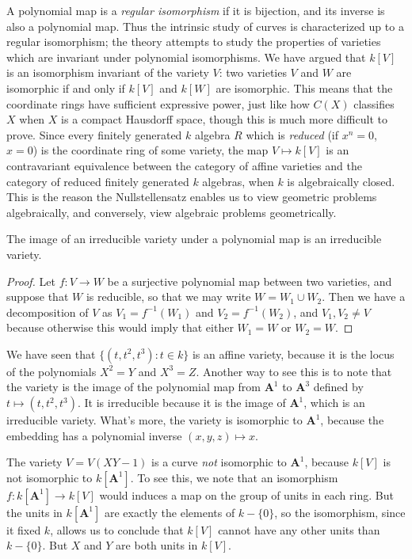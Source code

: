 A polynomial map is a \emph{regular isomorphism} if it is bijection, and its inverse is also a polynomial map. Thus the intrinsic study of curves is characterized up to a regular isomorphism; the theory attempts to study the properties of varieties which are invariant under polynomial isomorphisms. We have argued that $k[V]$ is an isomorphism invariant of the variety $V$: two varieties $V$ and $W$ are isomorphic if and only if $k[V]$ and $k[W]$ are isomorphic. This means that the coordinate rings have sufficient expressive power, just like how $C(X)$ classifies $X$ when $X$ is a compact Hausdorff space, though this is much more difficult to prove. Since every finitely generated $k$ algebra $R$ which is {\it reduced} (if $x^n = 0$, $x = 0$) is the coordinate ring of some variety, the map $V \mapsto k[V]$ is an contravariant equivalence between the category of affine varieties and the category of reduced finitely generated $k$ algebras, when $k$ is algebraically closed. This is the reason the Nullstellensatz enables us to view geometric problems algebraically, and conversely, view algebraic problems geometrically.

\begin{prop}
    The image of an irreducible variety under a polynomial map is an irreducible variety.
\end{prop}
\begin{proof}
    Let $f: V \to W$ be a surjective polynomial map between two varieties, and suppose that $W$ is reducible, so that we may write $W = W_1 \cup W_2$. Then we have a decomposition of $V$ as $V_1 = f^{-1}(W_1)$ and $V_2 = f^{-1}(W_2)$, and $V_1, V_2 \neq V$ because otherwise this would imply that either $W_1 = W$ or $W_2 = W$.
\end{proof}

\begin{example}
    We have seen that $\{ (t,t^2,t^3): t \in k \}$ is an affine variety, because it is the locus of the polynomials $X^2 = Y$ and $X^3 = Z$. Another way to see this is to note that the variety is the image of the polynomial map from $\mathbf{A}^1$ to $\mathbf{A}^3$ defined by $t \mapsto (t,t^2,t^3)$. It is irreducible because it is the image of $\mathbf{A}^1$, which is an irreducible variety. What's more, the variety is isomorphic to $\mathbf{A}^1$, because the embedding has a polynomial inverse $(x,y,z) \mapsto x$.
\end{example}

\begin{example}
    The variety $V = V(XY - 1)$ is a curve {\it not} isomorphic to $\mathbf{A}^1$, because $k[V]$ is not isomorphic to $k[\mathbf{A}^1]$. To see this, we note that an isomorphism $f: k[\mathbf{A}^1] \to k[V]$ would induces a map on the group of units in each ring. But the units in $k[\mathbf{A}^1]$ are exactly the elements of $k - \{ 0 \}$, so the isomorphism, since it fixed $k$, allows us to conclude that $k[V]$ cannot have any other units than $k - \{ 0 \}$. But $X$ and $Y$ are both units in $k[V]$.
\end{example}


